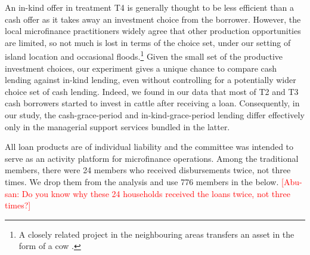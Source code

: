	An in-kind offer in treatment \textsf{T4} is generally thought to be less efficient than a cash offer as it takes away an investment choice from the borrower. However, the local microfinance practitioners widely agree that other production opportunities are limited, so not much is lost in terms of the choice set, under our setting of island location and occasional floods.\footnote{A closely related project in the neighbouring areas transfers an asset in the form of a cow \citep{BandieraBRAC2017}. }  Given the small set of the productive investment choices, our experiment gives a unique chance to compare cash lending against in-kind lending, even without controlling for a potentially wider choice set of cash lending. 
	Indeed, we found in our data that most of \textsf{T2} and \textsf{T3} cash borrowers started to invest in cattle after receiving a loan. Consequently, in our study, the cash-grace-period and in-kind-grace-period lending differ effectively only in the managerial support services bundled in the latter. 

	All loan products are of individual liability and the committee was intended to serve as an activity platform for microfinance operations. Among the \textsf{traditional} members, there were 24 members who received disbursements twice, not three times. We drop them from the analysis and use 776 members in the below. \textcolor{red}{[Abu-san: Do you know why these 24 households received the loans twice, not three times?]}



